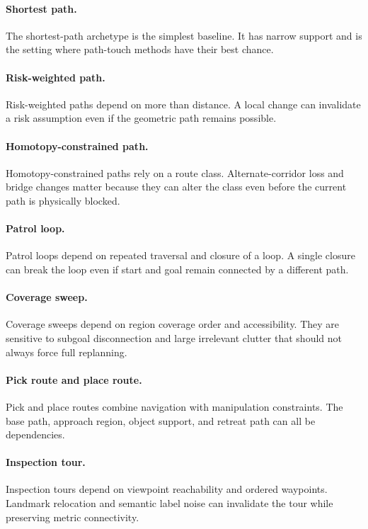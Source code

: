 \documentclass{article}
\begin{document}
\paragraph{Shortest path.}
The shortest-path archetype is the simplest baseline. It has narrow support and is the setting where path-touch methods have their best chance.

\paragraph{Risk-weighted path.}
Risk-weighted paths depend on more than distance. A local change can invalidate a risk assumption even if the geometric path remains possible.

\paragraph{Homotopy-constrained path.}
Homotopy-constrained paths rely on a route class. Alternate-corridor loss and bridge changes matter because they can alter the class even before the current path is physically blocked.

\paragraph{Patrol loop.}
Patrol loops depend on repeated traversal and closure of a loop. A single closure can break the loop even if start and goal remain connected by a different path.

\paragraph{Coverage sweep.}
Coverage sweeps depend on region coverage order and accessibility. They are sensitive to subgoal disconnection and large irrelevant clutter that should not always force full replanning.

\paragraph{Pick route and place route.}
Pick and place routes combine navigation with manipulation constraints. The base path, approach region, object support, and retreat path can all be dependencies.

\paragraph{Inspection tour.}
Inspection tours depend on viewpoint reachability and ordered waypoints. Landmark relocation and semantic label noise can invalidate the tour while preserving metric connectivity.
\end{document}

